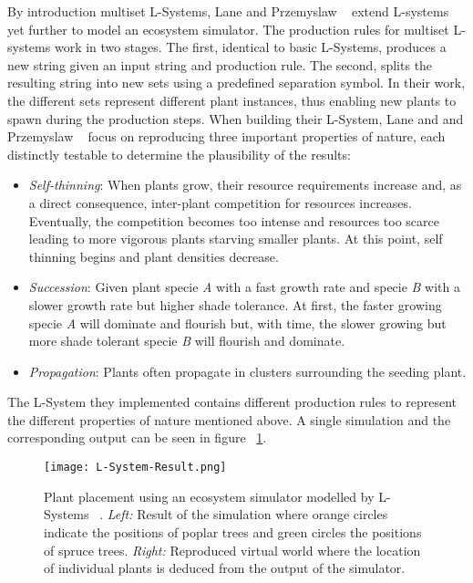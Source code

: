 By introduction multiset L-Systems, Lane and Przemyslaw ~\cite{Lane2002} extend L-systems yet further to model an ecosystem simulator. The production rules for multiset L-systems work in two stages. The first, identical to basic L-Systems, produces a new string given an input string and production rule. The second, splits the resulting string into new sets using a predefined separation symbol. In their work, the different sets represent different plant instances, thus enabling new plants to spawn during the production steps. When building their L-System, Lane and and Przemyslaw ~\cite{Lane2002} focus on reproducing three important properties of nature, each distinctly testable to determine the plausibility of the results:
\begin{itemize}
\item \textit{Self-thinning}: When plants grow, their resource requirements increase and, as a direct consequence, inter-plant competition for resources increases. Eventually, the competition becomes too intense and resources too scarce leading to more vigorous plants starving smaller plants. At this point, self thinning begins and plant densities decrease.
\item \textit{Succession}: Given plant specie \textit{A} with a fast growth rate and specie \textit{B} with a slower growth rate but higher shade tolerance. At first, the faster growing specie \textit{A} will dominate and flourish but, with time, the slower growing but more shade tolerant specie \textit{B} will flourish and dominate.
\item \textit{Propagation}: Plants often propagate in clusters surrounding the seeding plant.
\end{itemize}

The L-System they implemented contains different production rules to represent the different properties of nature mentioned above. A single simulation and the corresponding output can be seen in figure ~\ref{Plant placement using an ecosystem simulator modelled by L-System}.

\begin{figure}[h]
  \centering
    \texttt{[image: L-System-Result.png]}
    \caption[Plant placement using an ecosystem simulator modelled by L-Systems]{ Plant placement using an ecosystem simulator modelled by L-Systems ~\cite{Lane2002}. \textit{Left:} Result of the simulation where orange circles indicate the positions of poplar trees and green circles the positions of spruce trees. \textit{Right:} Reproduced virtual world where the location of individual plants is deduced from the output of the simulator.}
    \label{Plant placement using an ecosystem simulator modelled by L-System}
\end{figure}

